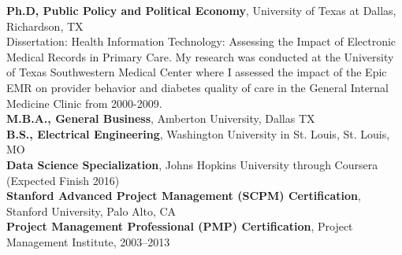 \documentclass{article}
\begin{document}
\noindent
{\bfseries Ph.D, Public Policy and Political Economy}, University of Texas at Dallas, Richardson, TX \\
Dissertation: Health Information Technology: Assessing the Impact of Electronic Medical Records in Primary Care. My research was conducted at the University of Texas Southwestern Medical Center where I assessed the impact of the Epic EMR on provider behavior and diabetes quality of care in the General Internal Medicine Clinic from 2000-2009. \\
{\bfseries M.B.A., General Business}, Amberton University, Dallas TX \\
{\bfseries B.S., Electrical Engineering}, Washington University in St. Louis, St. Louis, MO \\
{\bfseries Data Science Specialization}, Johns Hopkins University through Coursera (Expected Finish 2016) \\
{\bfseries Stanford Advanced Project Management (SCPM) Certification}, Stanford University, Palo Alto, CA \\
{\bfseries Project Management Professional (PMP) Certification}, Project Management Institute, 2003--2013
\end{document}
